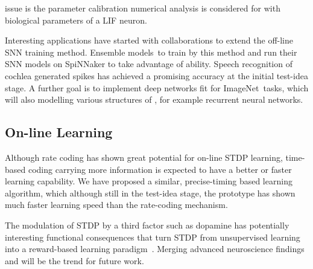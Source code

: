 \DIFdelbegin {}\DIFdelend \DIFaddbegin {}\DIFaddend issue is the parameter calibration \DIFdelbegin {}\DIFdelend \DIFaddbegin {}\DIFaddend numerical analysis is considered for \DIFdelbegin {}\DIFdelend \DIFaddbegin {}\DIFaddend with biological parameters of a LIF neuron.

Interesting applications have started with collaborations to extend the off-line SNN training method.
Ensemble models~\DIFdelbegin {}\DIFdelend \DIFaddbegin {}\DIFaddend to train by this method and run their SNN models on SpiNNaker to take advantage of \DIFdelbegin {}\DIFdelend \DIFaddbegin {}\DIFaddend ability.
Speech recognition of cochlea generated spikes has achieved a promising accuracy at the initial test-idea stage.
A further goal is to implement deep networks fit for ImageNet~\DIFdelbegin {}\DIFdelend \DIFaddbegin {}\DIFaddend tasks, which will also \DIFdelbegin {}\DIFdelend \DIFaddbegin {}\DIFaddend modelling various structures of \DIFdelbegin {}\DIFdelend \DIFaddbegin {}\DIFaddend , for example recurrent neural networks.


\subsection{On-line \DIFdelbegin {}\DIFdelend \DIFaddbegin {}\DIFaddend Learning}
Although rate coding has shown great potential for on-line STDP learning, time-based coding carrying more information is expected to have a better or faster learning capability.
We have proposed a similar, precise-timing based learning algorithm, which although still in the test-idea stage, the prototype has shown much faster learning speed than the rate-coding mechanism.

The modulation of STDP by a third factor such as dopamine has potentially interesting functional consequences that turn STDP from unsupervised learning into a reward-based learning paradigm~\DIFdelbegin {}\DIFdelend \DIFaddbegin {}\DIFaddend .
Merging advanced neuroscience findings and \DIFdelbegin {}\DIFdelend \DIFaddbegin {}\DIFaddend will be the trend for future work.



